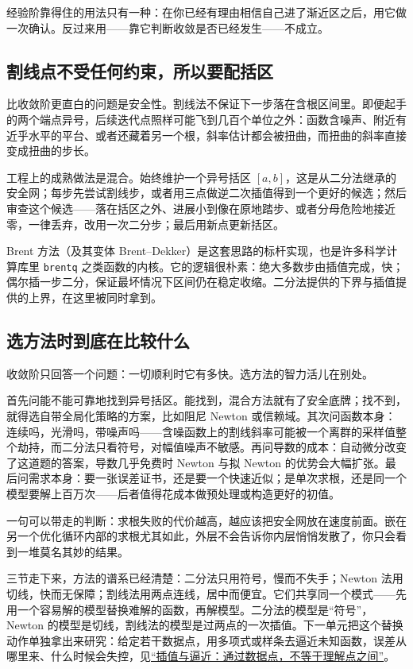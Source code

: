 经验阶靠得住的用法只有一种：在你已经有理由相信自己进了渐近区之后，用它做一次确认。反过来用——靠它判断收敛是否已经发生——不成立。

\subsection{割线点不受任何约束，所以要配括区}

比收敛阶更直白的问题是安全性。割线法不保证下一步落在含根区间里。即便起手的两个端点异号，后续迭代点照样可能飞到几百个单位之外：函数含噪声、附近有近乎水平的平台、或者还藏着另一个根，斜率估计都会被扭曲，而扭曲的斜率直接变成扭曲的步长。

工程上的成熟做法是混合。始终维护一个异号括区 \([a,b]\)，这是从二分法继承的安全网；每步先尝试割线步，或者用三点做逆二次插值得到一个更好的候选；然后审查这个候选——落在括区之外、进展小到像在原地踏步、或者分母危险地接近零，一律丢弃，改用一次二分步；最后用新点更新括区。

Brent 方法（及其变体 Brent--Dekker）是这套思路的标杆实现，也是许多科学计算库里 \texttt{brentq} 之类函数的内核。它的逻辑很朴素：绝大多数步由插值完成，快；偶尔插一步二分，保证最坏情况下区间仍在稳定收缩。二分法提供的下界与插值提供的上界，在这里被同时拿到。

\subsection{选方法时到底在比较什么}

收敛阶只回答一个问题：一切顺利时它有多快。选方法的智力活儿在别处。

首先问能不能可靠地找到异号括区。能找到，混合方法就有了安全底牌；找不到，就得选自带全局化策略的方案，比如阻尼 Newton 或信赖域。其次问函数本身：连续吗，光滑吗，带噪声吗——含噪函数上的割线斜率可能被一个离群的采样值整个劫持，而二分法只看符号，对幅值噪声不敏感。再问导数的成本：自动微分改变了这道题的答案，导数几乎免费时 Newton 与拟 Newton 的优势会大幅扩张。最后问需求本身：要一张误差证书，还是要一个快速近似；是单次求根，还是同一个模型要解上百万次——后者值得花成本做预处理或构造更好的初值。

一句可以带走的判断：求根失败的代价越高，越应该把安全网放在速度前面。嵌在另一个优化循环内部的求根尤其如此，外层不会告诉你内层悄悄发散了，你只会看到一堆莫名其妙的结果。

三节走下来，方法的谱系已经清楚：二分法只用符号，慢而不失手；Newton 法用切线，快而无保障；割线法用两点连线，居中而便宜。它们共享同一个模式——先用一个容易解的模型替换难解的函数，再解模型。二分法的模型是``符号''，Newton 的模型是切线，割线法的模型是过两点的一次插值。下一单元把这个替换动作单独拿出来研究：给定若干数据点，用多项式或样条去逼近未知函数，误差从哪里来、什么时候会失控，见\hyperref[ch:063]{``插值与逼近：通过数据点，不等于理解点之间''}。
